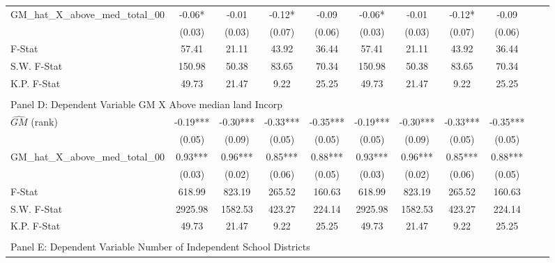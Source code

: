 \begin{table}[htbp]
\begin{threeparttable}
\begin{tabular}{l*{10}{c}}
\addlinespace
GM\_hat\_X\_above\_med\_total\_00&      -0.06*  &      -0.01   &      -0.12*  &      -0.09   &      -0.06*  &      -0.01   &      -0.12*  &      -0.09   \\
                &     (0.03)   &     (0.03)   &     (0.07)   &     (0.06)   &     (0.03)   &     (0.03)   &     (0.07)   &     (0.06)   \\
\midrule
F-Stat          &      57.41   &      21.11   &      43.92   &      36.44   &      57.41   &      21.11   &      43.92   &      36.44   \\
S.W. F-Stat     &     150.98   &      50.38   &      83.65   &      70.34   &     150.98   &      50.38   &      83.65   &      70.34   \\
K.P. F-Stat     &      49.73   &      21.47   &       9.22   &      25.25   &      49.73   &      21.47   &       9.22   &      25.25   \\
\cmidrule[\heavyrulewidth](lr){1-9} \\ \cmidrule[\heavyrulewidth](lr){1-9}
\multicolumn{8}{l}{Panel D: Dependent Variable GM X Above median land Incorp}\\
\cmidrule(lr){1-9}
$\hat{GM}$ (rank)&      -0.19***&      -0.30***&      -0.33***&      -0.35***&      -0.19***&      -0.30***&      -0.33***&      -0.35***\\
                &     (0.05)   &     (0.09)   &     (0.05)   &     (0.05)   &     (0.05)   &     (0.09)   &     (0.05)   &     (0.05)   \\
\addlinespace
GM\_hat\_X\_above\_med\_total\_00&       0.93***&       0.96***&       0.85***&       0.88***&       0.93***&       0.96***&       0.85***&       0.88***\\
                &     (0.03)   &     (0.02)   &     (0.06)   &     (0.05)   &     (0.03)   &     (0.02)   &     (0.06)   &     (0.05)   \\
\midrule
F-Stat          &     618.99   &     823.19   &     265.52   &     160.63   &     618.99   &     823.19   &     265.52   &     160.63   \\
S.W. F-Stat     &    2925.98   &    1582.53   &     423.27   &     224.14   &    2925.98   &    1582.53   &     423.27   &     224.14   \\
K.P. F-Stat     &      49.73   &      21.47   &       9.22   &      25.25   &      49.73   &      21.47   &       9.22   &      25.25   \\
\cmidrule[\heavyrulewidth](lr){1-9} \\ \cmidrule[\heavyrulewidth](lr){1-9}
\multicolumn{8}{l}{Panel E: Dependent Variable Number of Independent School Districts}\\

\end{tabular}
\end{threeparttable}
\end{table}
